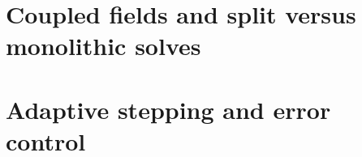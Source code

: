 
\section{Coupled fields and split versus monolithic solves}
\label{sec:time_nonlinear:coupling}


\section{Adaptive stepping and error control}
\label{sec:time_nonlinear:adaptive}

